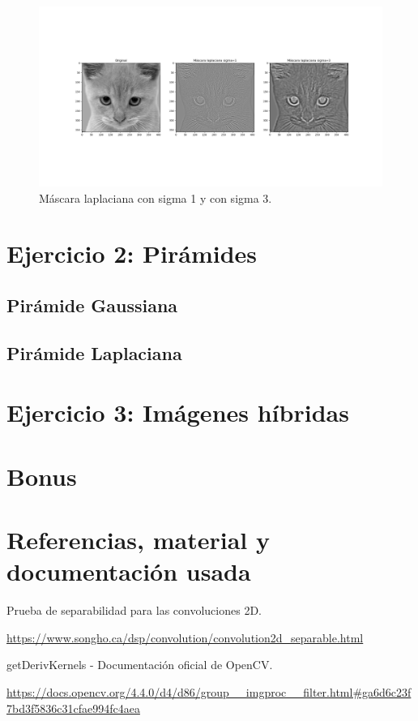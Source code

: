 \documentclass[12pt, spanish]{article}
\begin{document}
\begin{figure}[H]
  \centering
      \includegraphics[width=\textwidth]{ej1d.png}
 		 \caption{Máscara laplaciana con sigma 1 y con sigma 3.}
  		\label{fig:ej1d}

\end{figure}



\section{Ejercicio 2: Pirámides}

\subsection{Pirámide Gaussiana}

\subsection{Pirámide Laplaciana}



\section{Ejercicio 3: Imágenes híbridas}



\section{Bonus}

\newpage

\section{Referencias, material y documentación usada}


\begin{thebibliography}{9}

	Prueba de separabilidad para las convoluciones 2D.

	\url{https://www.songho.ca/dsp/convolution/convolution2d_separable.html}

	getDerivKernels - Documentación oficial de OpenCV.

	\url{https://docs.opencv.org/4.4.0/d4/d86/group__imgproc__filter.html#ga6d6c23f7bd3f5836c31cfae994fc4aea}

\end{thebibliography}
\end{document}
